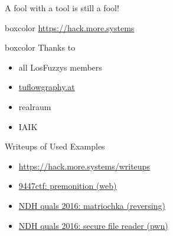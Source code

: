 \begin{frame}[plain]
	\begin{center}
		\huge A fool with a tool is still a fool!
	\end{center}
\end{frame}


{
\begin{frame}[plain]

  \begin{center}
  	\begin{beamercolorbox}[sep=0.5em,wd=10cm]{boxcolor}
	    \color{white}
	    {\huge \url{https://hack.more.systems}}
	\end{beamercolorbox}
  \end{center}

  \vspace{3em}


  \begin{beamercolorbox}[sep=1em,wd=5cm]{boxcolor}
    Thanks to

    \begin{itemize}
      \item all LosFuzzys members
      \item \url{tuflowgraphy.at}
      \item realraum
      \item IAIK
    \end{itemize}
  \end{beamercolorbox}

\end{frame}
}

\begin{frame}
  {Writeups of Used Examples}

  \begin{itemize}
    \item \url{https://hack.more.systems/writeups}
  \end{itemize}

  \begin{itemize}
    \item
      \href{http://losfuzzys.github.io/writeup/2015/12/07/9447ctf-premonition/}
      {9447ctf: premonition (web)}
    \item \href{https://losfuzzys.github.io/writeup/2016/04/04/ndhquals2016-matriochka/}
      {NDH quals 2016: matriochka (reversing)}
    \item \href{https://losfuzzys.github.io/writeup/2016/04/04/ndhquals2016-secure-file-reader/}
      {NDH quals 2016: secure file reader (pwn)}
  \end{itemize}

\end{frame}

